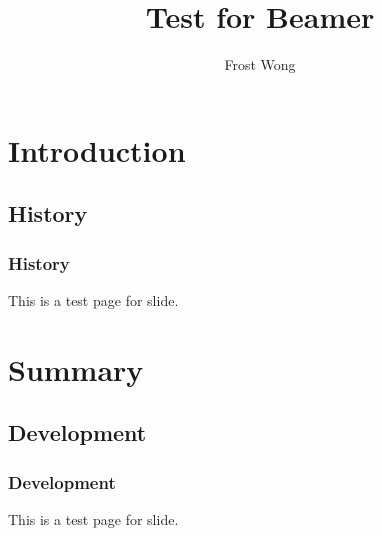 \documentclass[red,trans]{beamer}
\title{Test for Beamer}
\institute{Beijing University of Aeronautics and Astronautics}
\author{Frost Wong}
\begin{document}
\titlepage
\section{Introduction}
\subsection{History}
\begin{frame}
	\frametitle{History}
	This is a test page for slide.
\end{frame}


\section{Summary}
\subsection{Development}
\begin{frame}
	\frametitle{Development}
	This is a test page for slide.
\end{frame}
\end{document}
